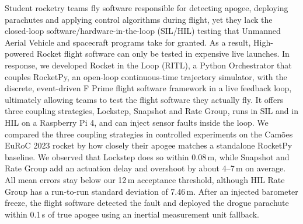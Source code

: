 Student rocketry teams fly software responsible for detecting apogee, deploying parachutes and applying control algorithms during flight, yet they lack the closed-loop software/hardware-in-the-loop (SIL/HIL) testing that Unmanned Aerial Vehicle and spacecraft programs take for granted. As a result, High-powered Rocket flight software can only be tested in expensive live launches.
In response, we developed Rocket in the Loop (RITL), a Python Orchestrator that couples RocketPy, an open-loop continuous-time trajectory simulator, with the discrete, event-driven F Prime flight software framework in a live feedback loop, ultimately allowing teams to test the flight software they actually fly. It offers three coupling strategies, Lockstep, Snapshot and Rate Group, runs in SIL and in HIL on a Raspberry Pi 4, and can inject sensor faults inside the loop. We compared the three coupling strategies in controlled experiments on the Camões EuRoC 2023 rocket by how closely their apogee matches a standalone RocketPy baseline. We observed that Lockstep does so within 0.08\,m, while Snapshot and Rate Group add an actuation delay and overshoot by about 4–7\,m on average. All mean errors stay below our 12\,m acceptance threshold, although HIL Rate Group has a run-to-run standard deviation of 7.46\,m. After an injected barometer freeze, the flight software detected the fault and deployed the drogue parachute within 0.1\,s of true apogee using an inertial measurement unit fallback. 
